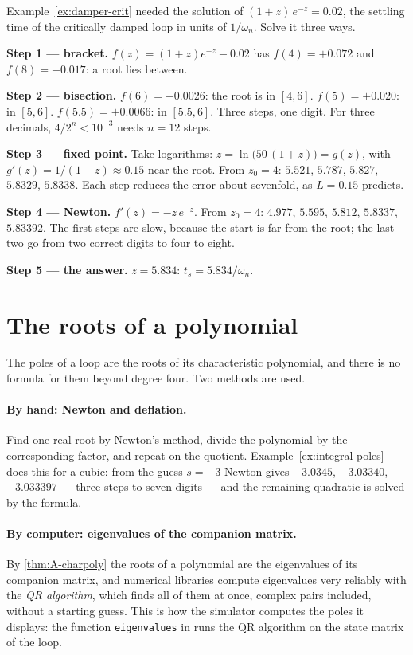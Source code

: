 \begin{example}
\label{ex:F-three}
Example~\ref{ex:damper-crit} needed the solution of $(1 + z)\,e^{-z} = 0.02$, the settling time of the critically damped loop in units of $1/\omega_n$. Solve it three ways.

\textbf{Step 1 — bracket.} $f(z) = (1 + z)e^{-z} - 0.02$ has $f(4) = +0.072$ and $f(8) = -0.017$: a root lies between.

\textbf{Step 2 — bisection.} $f(6) = -0.0026$: the root is in $[4, 6]$. $f(5) = +0.020$: in $[5, 6]$. $f(5.5) = +0.0066$: in $[5.5, 6]$. Three steps, one digit. For three decimals, $4/2^n < 10^{-3}$ needs $n = 12$ steps.

\textbf{Step 3 — fixed point.} Take logarithms: $z = \ln\big(50\,(1 + z)\big) = g(z)$, with $g'(z) = 1/(1 + z) \approx 0.15$ near the root. From $z_0 = 4$: $5.521$, $5.787$, $5.827$, $5.8329$, $5.8338$. Each step reduces the error about sevenfold, as $L = 0.15$ predicts.

\textbf{Step 4 — Newton.} $f'(z) = -z\,e^{-z}$. From $z_0 = 4$: $4.977$, $5.595$, $5.812$, $5.8337$, $5.83392$. The first steps are slow, because the start is far from the root; the last two go from two correct digits to four to eight.

\textbf{Step 5 — the answer.} $z = 5.834$: $t_s = 5.834/\omega_n$.
\end{example}

\section{The roots of a polynomial}

The poles of a loop are the roots of its characteristic polynomial, and there is no formula for them beyond degree four. Two methods are used.

\paragraph{By hand: Newton and deflation.} Find one real root by Newton's method, divide the polynomial by the corresponding factor, and repeat on the quotient. Example~\ref{ex:integral-poles} does this for a cubic: from the guess $s = -3$ Newton gives $-3.0345$, $-3.03340$, $-3.033397$ — three steps to seven digits — and the remaining quadratic is solved by the formula.

\paragraph{By computer: eigenvalues of the companion matrix.} By \cref{thm:A-charpoly} the roots of a polynomial are the eigenvalues of its companion matrix, and numerical libraries compute eigenvalues very reliably with the \emph{QR algorithm}, which finds all of them at once, complex pairs included, without a starting guess. This is how the simulator computes the poles it displays: the function \texttt{eigenvalues} in  runs the QR algorithm on the state matrix of the loop.


